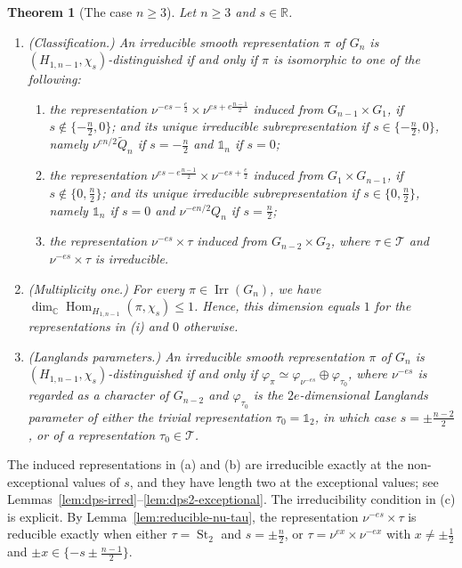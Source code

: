 \documentclass[11pt]{amsart}
\numberwithin{equation}{section}
\theoremstyle{plain}
\newtheorem{mainthm}{Theorem}
\theoremstyle{definition}
\theoremstyle{remark}
\newcommand{\R}{\mathbb{R}}
\newcommand{\C}{\mathbb{C}}
\newcommand{\one}{\mathds{1}}
\newcommand{\T}{\mathcal{T}}
\DeclareMathOperator{\Hom}{Hom}
\DeclareMathOperator{\Irr}{Irr}
\DeclareMathOperator{\St}{St}
\newcommand{\Qt}{\widetilde{Q}}
\begin{document}
\begin{mainthm}[The case $n\ge3$]\label{thm:A}
	Let $n\ge3$ and $s\in\R$.
	\begin{enumerate}[label=\textup{(\roman*)}]
		\item \textup{(Classification.)} An irreducible smooth representation $\pi$ of $G_n$ is $(H_{1,n-1},\chi_s)$-distinguished if and only if $\pi$ is isomorphic to one of the following:
		\begin{enumerate}[label=\textup{(\alph*)}]
			\item the representation $\nu^{-es-\frac e2}\times\nu^{es+e\frac{n-1}2}$ induced from $G_{n-1}\times G_1$, if $s\notin\{-\frac n2,0\}$; and its unique irreducible subrepresentation if $s\in\{-\frac n2,0\}$, namely $\nu^{en/2}\Qt_n$ if $s=-\frac n2$ and $\one_n$ if $s=0$;
			\item the representation $\nu^{es-e\frac{n-1}2}\times\nu^{-es+\frac e2}$ induced from $G_1\times G_{n-1}$, if $s\notin\{0,\frac n2\}$; and its unique irreducible subrepresentation if $s\in\{0,\frac n2\}$, namely $\one_n$ if $s=0$ and $\nu^{-en/2}Q_n$ if $s=\frac n2$;
			\item the representation $\nu^{-es}\times\tau$ induced from $G_{n-2}\times G_2$, where $\tau\in\T$ and $\nu^{-es}\times\tau$ is irreducible.
		\end{enumerate}
		\item \textup{(Multiplicity one.)} For every $\pi\in\Irr(G_n)$, we have $\dim_\C\Hom_{H_{1,n-1}}(\pi,\chi_s)\le1$. Hence, this dimension equals $1$ for the representations in \textup{(i)} and $0$ otherwise.
		\item \textup{(Langlands parameters.)}  An irreducible smooth representation $\pi$ of $G_n$ is $(H_{1,n-1},\chi_s)$-distinguished if and only if
		$\varphi_{\pi}\simeq\varphi_{\nu^{-es}}\oplus\varphi_{\tau_0}$,
		where $\nu^{-es}$ is regarded as a character of $G_{n-2}$ and $\varphi_{\tau_0}$ is the $2e$-dimensional Langlands parameter of either the trivial representation $\tau_0=\one_2$, in which case $s=\pm\frac{n-2}2$, or of a representation $\tau_0\in\T$.
	\end{enumerate}
\end{mainthm}

The induced representations in (a) and (b) are irreducible exactly at the non-exceptional values of $s$, and they have length two at the exceptional values; see Lemmas~\ref{lem:dps-irred}--\ref{lem:dps2-exceptional}. The irreducibility condition in (c) is explicit. By Lemma~\ref{lem:reducible-nu-tau}, the representation $\nu^{-es}\times\tau$ is reducible exactly when either $\tau=\St_2$ and $s=\pm\frac n2$, or $\tau=\nu^{ex}\times\nu^{-ex}$ with $x\ne\pm\frac12$ and $\pm x\in\{-s\pm\frac{n-1}2\}$.
\end{document}
